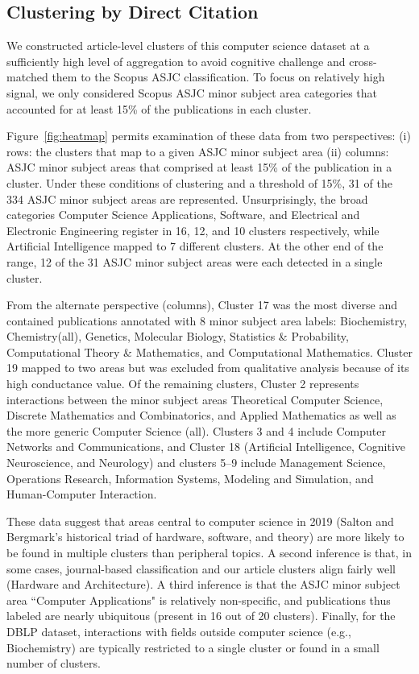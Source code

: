 \subsection{Clustering by Direct Citation}  

We constructed article-level clusters of this computer science dataset at a sufficiently high level of aggregation to avoid cognitive challenge and cross-matched them to  the  Scopus ASJC classification. 
To focus on relatively high signal, we only considered Scopus ASJC minor subject area categories that accounted for at least 15\% of the publications in each cluster. 

Figure~\ref{fig:heatmap} permits examination of these data from two perspectives: (i) rows: the clusters that map to a given ASJC minor subject area (ii) columns: ASJC minor subject areas that comprised at least 15\% of the publication in a cluster. Under these conditions of clustering and a threshold of 15\%, 31 of the 334 ASJC minor subject areas are represented. Unsurprisingly, the broad categories Computer Science Applications, Software, and Electrical and Electronic Engineering register in 16, 12, and 10 clusters respectively, while Artificial Intelligence mapped to 7 different clusters. At the other end of the range, 12 of the 31 ASJC minor subject areas were each detected in a single cluster. 

From the alternate perspective (columns), Cluster 17 was the most diverse and contained publications annotated with 8 minor subject area labels: Biochemistry, Chemistry(all), Genetics, Molecular Biology,  Statistics \& Probability, Computational Theory \& Mathematics, and Computational Mathematics. Cluster 19 mapped to two areas but was excluded from qualitative analysis because of its high conductance value. Of the remaining clusters, Cluster 2 represents interactions between the minor subject areas Theoretical Computer Science, Discrete Mathematics and Combinatorics, and Applied Mathematics as well as the more generic Computer Science (all). Clusters 3 and 4 include Computer Networks and Communications, and Cluster 18 (Artificial Intelligence, Cognitive Neuroscience, and Neurology) and clusters 5--9 include Management Science, Operations Research, Information Systems, Modeling and Simulation, and Human-Computer Interaction.

These data suggest that areas central to computer science in 2019 (Salton and Bergmark's historical triad of hardware, software, and theory) are more likely to be found in multiple clusters than peripheral topics.
A second inference is that, in some cases, journal-based classification and our article clusters align fairly well (Hardware and Architecture). 
A third inference is that the ASJC minor subject area ``Computer Applications" is relatively non-specific, and publications thus labeled are nearly ubiquitous (present in 16 out of 20 clusters).  Finally,   for the DBLP dataset, interactions with fields outside computer science (e.g., Biochemistry)  are  typically restricted to a single cluster or found in a small number of clusters.

